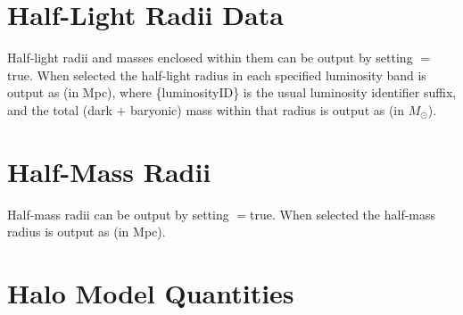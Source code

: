 \section{Half-Light Radii Data}

Half-light radii and masses enclosed within them can be output by setting {\normalfont \ttfamily [outputHalfLightData]}$=${\normalfont \ttfamily true}. When selected the half-light radius in each specified luminosity band is output as {\normalfont {}} (in Mpc), where {\normalfont \ttfamily\{luminosityID\}} is the usual luminosity identifier suffix, and the total (dark + baryonic) mass within that radius is output as {\normalfont {}} (in $M_\odot$).

\section{Half-Mass Radii}

Half-mass radii can be output by setting {\normalfont \ttfamily [outputHalfMassData]}$=${\normalfont \ttfamily true}. When selected the half-mass radius is output as {\normalfont \ttfamily [halfMassRadius]} (in Mpc).

\section{Halo Model Quantities}\label{sec:HaloModelOutput}

